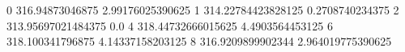 0 316.94873046875 2.99176025390625
1 314.22784423828125 0.2708740234375
2 313.95697021484375 0.0
4 318.44732666015625 4.4903564453125
6 318.100341796875 4.14337158203125
8 316.9209899902344 2.964019775390625
